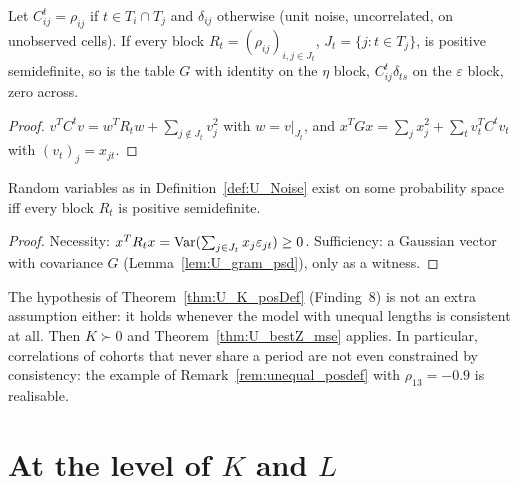 \begin{lemma}\label{lem:U_gram_psd}
  \leanok
  Let $C^t_{ij} = \rho_{ij}$ if $t \in T_i \cap T_j$ and $\delta_{ij}$
  otherwise (unit noise, uncorrelated, on unobserved cells). If every block
  $R_t = (\rho_{ij})_{i,j \in J_t}$, $J_t = \{j : t \in T_j\}$, is positive
  semidefinite, so is the table $G$ with identity on the $\eta$ block,
  $C^t_{ij}\delta_{ts}$ on the $\varepsilon$ block, zero across.
\end{lemma}
\begin{proof}
  \leanok
  $v^TC^tv = w^TR_tw + \sum_{j\notin J_t} v_j^2$ with $w = v|_{J_t}$, and
  $x^TGx = \sum_j x_j^2 + \sum_t v_t^TC^tv_t$ with $(v_t)_j = x_{jt}$.
\end{proof}

\begin{theorem}\label{thm:U_exists_noise}
  \leanok
  Random variables as in Definition~\ref{def:U_Noise} exist on some
  probability space iff every block $R_t$ is positive semidefinite.
\end{theorem}
\begin{proof}
  \leanok
  Necessity: $x^TR_tx = \operatorname{Var}(\sum_{j\in J_t} x_j\varepsilon_{jt}) \ge 0$.
  Sufficiency: a Gaussian vector with covariance $G$
  (Lemma~\ref{lem:U_gram_psd}), only as a witness.
\end{proof}

\begin{remark}\label{rem:U_moments_psd}
  The hypothesis of Theorem~\ref{thm:U_K_posDef} (Finding~8) is not an extra
  assumption either: it holds whenever the model with unequal lengths is
  consistent at all. Then $K \succ 0$ and Theorem~\ref{thm:U_bestZ_mse}
  applies. In particular, correlations of cohorts that never share a period
  are not even constrained by consistency: the example of
  Remark~\ref{rem:unequal_posdef} with $\rho_{13} = -0.9$ is realisable.
\end{remark}

\section{At the level of $K$ and $L$}\label{sec:core_moments}

